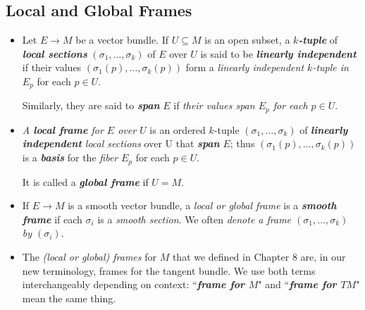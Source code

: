 \documentclass[11pt]{article}
\begin{document}
\subsection{Local and Global Frames}
\begin{itemize}
\item \begin{definition}
Let $E \rightarrow M$ be a vector bundle. If $U \subseteq M$ is an open subset, a \emph{\textbf{$k$-tuple}} of \emph{\textbf{local sections}} $(\sigma_1,\ldots, \sigma_k)$ of $E$ over $U$ is said to be \emph{\textbf{linearly independent}} if their values $(\sigma_1(p),\ldots, \sigma_k(p))$ form a \emph{linearly independent $k$-tuple in $E_p$} for each $p\in U$. 

Similarly, they are said to \emph{\textbf{span}} $E$ if \emph{their values span $E_p$ for each $p \in U$}.
\end{definition}

\item \begin{definition}
\emph{A \textbf{local frame} for $E$ over $U$} is an ordered $k$-tuple $(\sigma_1,\ldots, \sigma_k)$ of \emph{\textbf{linearly independent} local sections} over U that \emph{\textbf{span}} $E$; thus $(\sigma_1(p),\ldots, \sigma_k(p))$ is a \emph{\textbf{basis}} for the \emph{fiber} $E_p$ for each $p \in U$. 

It is called a \emph{\textbf{global frame}} if $U = M$. 
\end{definition}


\item \begin{definition}
If  $E \rightarrow M$ is a smooth vector bundle, a \emph{local or global frame} is a \emph{\textbf{smooth frame}} if each $\sigma_i$ is a \emph{smooth section}. We often\emph{ denote a frame $(\sigma_1,\ldots, \sigma_k)$ by $(\sigma_i)$}.
\end{definition}


\item \begin{remark}
The \emph{(local or global) frames} for $M$ that we defined in Chapter 8 are, in our new terminology, frames for the tangent bundle. We use both terms interchangeably
depending on context: ``\emph{\textbf{frame for $M$}}" and ``\emph{\textbf{frame for $TM$}}" mean the same thing.
\end{remark}


\end{itemize}
\end{document}
